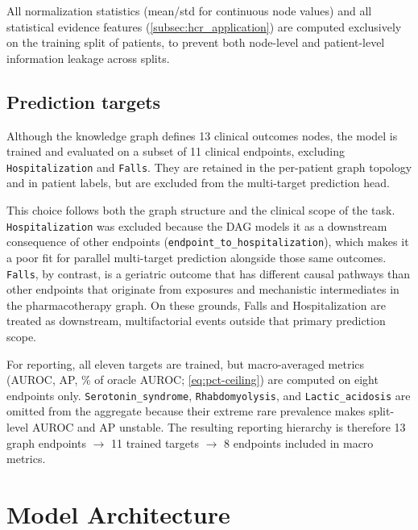  All normalization statistics (mean/std for continuous node values) 
 and all statistical evidence features (\cref{subsec:hcr_application}) are computed exclusively on the training split of patients, to 
 prevent both node-level and patient-level information leakage across splits.

\subsection{Prediction targets}
\label{subsec:taskB-prediction-targets}
Although the knowledge graph defines 13 
clinical outcomes nodes, the model is trained and evaluated on a
subset of 11 clinical endpoints, excluding
\texttt{Hospitalization} and
\texttt{Falls}. They are retained in the per-patient graph topology and in
patient labels, but are excluded from the multi-target prediction head.

This choice follows both the graph structure and the clinical scope of
the task. \texttt{Hospitalization} was excluded because the DAG models it
as a downstream consequence of other endpoints
(\texttt{endpoint\_to\_hospitalization}), which makes it a poor fit for
parallel multi-target prediction alongside those same outcomes. 
\texttt{Falls}, by contrast, is a geriatric outcome that has different 
causal pathways than other endpoints that originate from exposures
and mechanistic intermediates in the pharmacotherapy graph. On these grounds, Falls and Hospitalization are treated as downstream, multifactorial events outside
that primary prediction scope.

For reporting, all eleven targets are trained, but macro-averaged metrics
(AUROC, AP, \% of oracle AUROC; \cref{eq:pct-ceiling}) are computed on eight endpoints only.
\texttt{Serotonin\_syndrome}, \texttt{Rhabdomyolysis}, and
\texttt{Lactic\_acidosis} are omitted from the aggregate because their
extreme rare prevalence makes
split-level AUROC and AP unstable.
The resulting reporting hierarchy is therefore 13 graph endpoints $\rightarrow$ 11 trained targets $\rightarrow$ 8 endpoints included in macro metrics.

\section{Model Architecture}
\label{sec:taskB-architecture}

